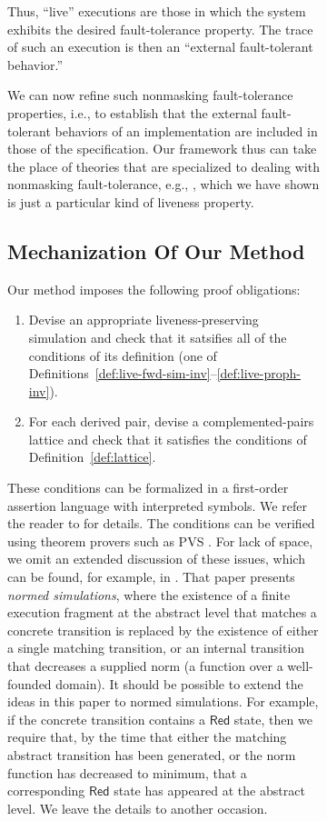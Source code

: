 \documentclass[11pt]{article}
\newcommand{\bn}{\begin{enumerate}}
\newcommand{\en}{\end{enumerate}}
\newcommand{\empi}[1]{\textit{#1\/}}
\newcommand{\RED}{\mathsf{Red}}
\begin{document}
\begin{figure}[htb]
\begin{figure}[htb]
Thus, ``live'' executions are those in which the system exhibits the
desired fault-tolerance property.  The trace of such an execution is
then an ``external fault-tolerant behavior.''

We can now refine such nonmasking fault-tolerance properties, i.e., to
establish that the external fault-tolerant behaviors of an
implementation are included in those of the specification.  Our
framework thus can take the place of theories that are specialized to
dealing with nonmasking fault-tolerance, e.g., \cite{DA02},
which we have shown is just a particular kind of liveness property.


 
\subsection{Mechanization Of Our Method}
\label{sec:mechanization}

Our method imposes the following proof obligations:
\bn

\item Devise an appropriate liveness-preserving simulation and check
that it satsifies all of the conditions of its definition
(one of Definitions~\ref{def:live-fwd-sim-inv}--\ref{def:live-proph-inv}).

\item For each derived pair, devise a complemented-pairs lattice and check
  that it satisfies the conditions of Definition~\ref{def:lattice}.

\en

These conditions can be formalized in a first-order assertion language
with interpreted symbols. We refer the reader to \cite{GL00,GV04} for
details. The conditions can be verified using theorem provers
such as PVS \cite{OSR92}. For lack of space, we omit an extended
discussion of these issues, which can be found, for example, in
\cite{GV04}.
That paper presents \empi{normed simulations}, where the 
existence of a finite execution fragment at the abstract level that
matches a concrete transition is replaced by the existence 
of either a single matching transition, or an internal transition that
decreases a supplied norm (a function over a well-founded domain).
It should be possible to extend the ideas in this paper to normed
simulations. For example, if the concrete transition contains a $\RED$
state, then we require that, by the time that either the matching
abstract transition has been generated, or the norm function has
decreased to minimum, that a corresponding $\RED$ state has appeared
at the abstract level. We leave the details to another occasion.








\end{figure}
\end{figure}
\end{document}
